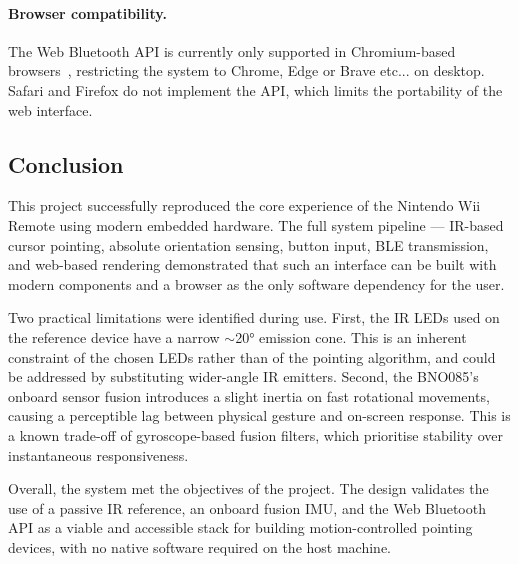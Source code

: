 \documentclass[12pt, a4paper]{article}
\begin{document}
\paragraph{Browser compatibility.}
The Web Bluetooth API is currently only supported in Chromium-based browsers~\cite{chrome_bluetooth}, restricting the system to Chrome, Edge or Brave etc... on desktop. Safari and Firefox do not implement the API, which limits the portability of the web interface.


\subsection{Conclusion}

This project successfully reproduced the core experience of the Nintendo Wii Remote using modern embedded hardware. The full system pipeline — IR-based cursor pointing, absolute orientation sensing, button input, BLE transmission, and web-based rendering demonstrated that such an interface can be built with modern components and a browser as the only software dependency for the user.

Two practical limitations were identified during use. First, the IR LEDs used on the reference device have a narrow $\sim$20° emission cone. This is an inherent constraint of the chosen LEDs rather than of the pointing algorithm, and could be addressed by substituting wider-angle IR emitters. Second, the BNO085's onboard sensor fusion introduces a slight inertia on fast rotational movements, causing a perceptible lag between physical gesture and on-screen response. This is a known trade-off of gyroscope-based fusion filters, which prioritise stability over instantaneous responsiveness.

Overall, the system met the objectives of the project. The design validates the use of a passive IR reference, an onboard fusion IMU, and the Web Bluetooth API as a viable and accessible stack for building motion-controlled pointing devices, with no native software required on the host machine.
\end{document}

